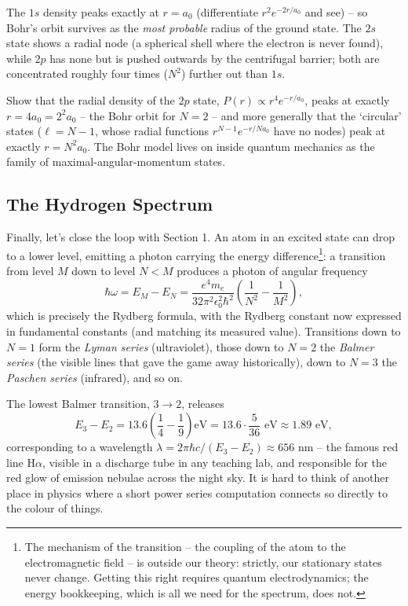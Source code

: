 \documentclass[a4paper]{scrartcl}
\begin{document}
The $1s$ density peaks exactly at $r = a_0$ (differentiate $r^2 e^{-2r/a_0}$ and see) -- so Bohr's orbit survives as the \emph{most probable} radius of the ground state. The $2s$ state shows a radial node (a spherical shell where the electron is never found), while $2p$ has none but is pushed outwards by the centrifugal barrier; both are concentrated roughly four times ($N^2$) further out than $1s$.

\begin{exercise}
    Show that the radial density of the $2p$ state, $P(r) \propto r^4 e^{-r/a_0}$, peaks at exactly $r = 4 a_0 = 2^2 a_0$ -- the Bohr orbit for $N = 2$ -- and more generally that the `circular' states ($\ell = N - 1$, whose radial functions $r^{N-1}e^{-r/Na_0}$ have no nodes) peak at exactly $r = N^2 a_0$. The Bohr model lives on inside quantum mechanics as the family of maximal-angular-momentum states.
\end{exercise}

\subsection{The Hydrogen Spectrum}

Finally, let's close the loop with Section 1. An atom in an excited state can drop to a lower level, emitting a photon carrying the energy difference\footnote{The mechanism of the transition -- the coupling of the atom to the electromagnetic field -- is outside our theory: strictly, our stationary states never change. Getting this right requires quantum electrodynamics; the energy bookkeeping, which is all we need for the spectrum, does not.}: a transition from level $M$ down to level $N < M$ produces a photon of angular frequency
$$
\hbar \omega = E_M - E_N = \frac{e^4 m_e}{32 \pi^2 \epsilon_0^2 \hbar^2} \left( \frac{1}{N^2} - \frac{1}{M^2} \right),
$$
which is precisely the Rydberg formula, with the Rydberg constant now expressed in fundamental constants (and matching its measured value). Transitions down to $N = 1$ form the \emph{Lyman series} (ultraviolet), those down to $N = 2$ the \emph{Balmer series} (the visible lines that gave the game away historically), down to $N = 3$ the \emph{Paschen series} (infrared), and so on.

\begin{example}
    The lowest Balmer transition, $3 \rightarrow 2$, releases
    $$
    E_3 - E_2 = 13.6 \left( \frac{1}{4} - \frac{1}{9} \right) \text{eV} = 13.6 \cdot \frac{5}{36} \text{ eV} \approx 1.89 \text{ eV},
    $$
    corresponding to a wavelength $\lambda = 2 \pi \hbar c / (E_3 - E_2) \approx 656$ nm -- the famous red line H$\alpha$, visible in a discharge tube in any teaching lab, and responsible for the red glow of emission nebulae across the night sky. It is hard to think of another place in physics where a short power series computation connects so directly to the colour of things.
\end{example}
\end{document}

